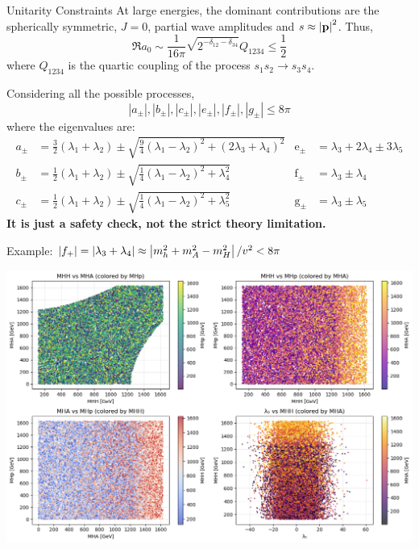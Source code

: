 \documentclass{../bredelebeamer}
\begin{document}
\begin{frame}{Unitarity Constraints}
    At large energies, the dominant contributions are the spherically symmetric, $J=0$, partial wave amplitudes and $s\approx \abs{\mathbf{p}}^2$. Thus, 
    \begin{equation}
        \Re{a_0} \sim \frac{1}{16 \pi} \sqrt{2 ^{-\delta_{12}-\delta_{34}}} Q_{1234} \leq \frac{1}{2}
    \end{equation}
    where $Q_{1234} $ is the quartic coupling of the process $s_1 s_2 \rightarrow s_3 s_4$.


Considering all the possible processes, 
\begin{equation*}
|a_\pm|, |b_\pm|, |c_\pm|, |e_\pm|, |f_\pm|, |g_\pm| \leq 8\pi
\end{equation*}
where the eigenvalues are:
  {\small
  \begin{equation}
    \begin{aligned}
    a_{ \pm} & =\frac{3}{2}\left(\lambda_1+\lambda_2\right) \pm \sqrt{\frac{9}{4}\left(\lambda_1-\lambda_2\right)^2+\left(2 \lambda_3+\lambda_4\right)^2} &\mathrm{e}_{ \pm} & =\lambda_3+2 \lambda_4 \pm 3 \lambda_5 \\
    b_{ \pm} & =\frac{1}{2}\left(\lambda_1+\lambda_2\right) \pm \sqrt{\frac{1}{4}\left(\lambda_1-\lambda_2\right)^2+\lambda_4^2} & \mathrm{f}_{ \pm} & =\lambda_3 \pm \lambda_4 \\
    c_{ \pm} & =\frac{1}{2}\left(\lambda_1+\lambda_2\right) \pm \sqrt{\frac{1}{4}\left(\lambda_1-\lambda_2\right)^2+\lambda_5^2} & \mathrm{g}_{ \pm} & =\lambda_3 \pm \lambda_5
    \end{aligned}
  \end{equation}
  }
  \textbf{It is just a safety check, not the strict theory limitation.}
\end{frame}

\begin{frame}{Example: $\abs{f_+}=\abs{\lambda_3 + \lambda_4}\approx \left| m_h^2 + m_A^2 - m_{H}^2 \right|/v^2  < 8\pi$}
  \begin{center}
    \includegraphics[width=\textwidth]{unitarity_f_plus_THDM_param_scan_analysis}
  \end{center}
    
\end{frame}
\end{document}
